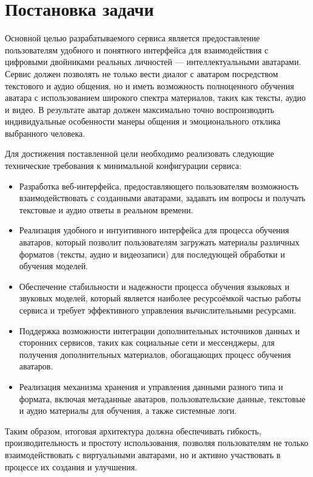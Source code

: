 \chapter{Постановка задачи} 
Основной целью разрабатываемого сервиса является предоставление пользователям удобного и понятного интерфейса для 
взаимодействия с цифровыми двойниками реальных личностей — интеллектуальными аватарами. Сервис должен позволять не только 
вести диалог с аватаром посредством текстового и аудио общения, но и иметь возможность полноценного обучения аватара с 
использованием широкого спектра материалов, таких как тексты, аудио и видео. В результате аватар должен максимально точно 
воспроизводить индивидуальные особенности манеры общения и эмоционального отклика выбранного человека.

Для достижения поставленной цели необходимо реализовать следующие технические требования к минимальной конфигурации сервиса:

\begin{itemize}
\item Разработка веб-интерфейса, предоставляющего пользователям возможность 
взаимодействовать с созданными аватарами, задавать им вопросы и получать текстовые и аудио 
ответы в реальном времени.
\item Реализация удобного и интуитивного интерфейса для процесса обучения аватаров, который 
позволит пользователям загружать материалы различных форматов (тексты, аудио и видеозаписи) 
для последующей обработки и обучения моделей.
\item Обеспечение стабильности и надежности процесса обучения языковых и звуковых моделей, 
который является наиболее ресурсоёмкой частью работы сервиса и требует эффективного 
управления вычислительными ресурсами.
\item Поддержка возможности интеграции дополнительных источников данных и сторонних 
сервисов, таких как социальные сети и мессенджеры, для получения дополнительных материалов, 
обогащающих процесс обучения аватаров.
\item Реализация механизма хранения и управления данными разного типа и формата, включая 
метаданные аватаров, пользовательские данные, текстовые и аудио материалы для обучения, а 
также системные логи.
\end{itemize}

Таким образом, итоговая архитектура должна обеспечивать гибкость, производительность и 
простоту использования, позволяя пользователям не только взаимодействовать с виртуальными 
аватарами, но и активно участвовать в процессе их создания и улучшения.